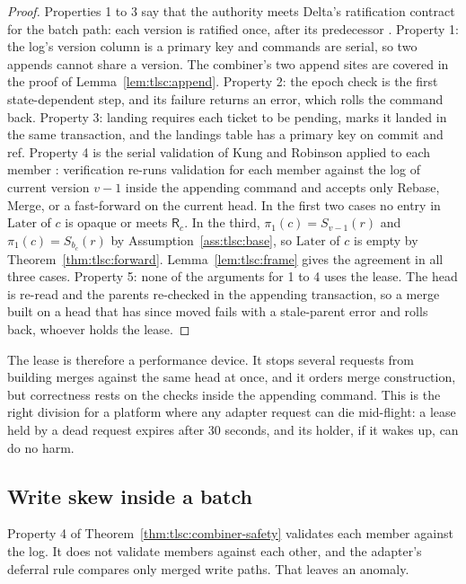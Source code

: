 \documentclass[11pt,letterpaper]{article}
\theoremstyle{definition}
\theoremstyle{remark}
\newcommand{\R}{\mathsf{R}}
\newcommand{\Snap}[1]{S_{#1}}
\newcommand{\Later}{\mathrm{Later}}
\newcommand{\fp}{\pi_1}
\begin{document}
\begin{proof}
Properties 1 to 3 say that the authority meets Delta's ratification contract for the batch path: each version is ratified once, after its predecessor \cite{deltaprotocol}. Property 1: the log's version column is a primary key and commands are serial, so two appends cannot share a version. The combiner's two append sites are covered in the proof of Lemma~\ref{lem:tlsc:append}. Property 2: the epoch check is the first state-dependent step, and its failure returns an error, which rolls the command back. Property 3: landing requires each ticket to be pending, marks it landed in the same transaction, and the landings table has a primary key on commit and ref. Property 4 is the serial validation of Kung and Robinson applied to each member \cite[Section 4]{kung1981occ}: verification re-runs validation for each member against the log of current version $v-1$ inside the appending command and accepts only Rebase, Merge, or a fast-forward on the current head. In the first two cases no entry in $\Later$ of $c$ is opaque or meets $\R_c$. In the third, $\fp(c)=\Snap{v-1}(r)$ and $\fp(c)=\Snap{b_c}(r)$ by Assumption~\ref{ass:tlsc:base}, so $\Later$ of $c$ is empty by Theorem~\ref{thm:tlsc:forward}. Lemma~\ref{lem:tlsc:frame} gives the agreement in all three cases. Property 5: none of the arguments for 1 to 4 uses the lease. The head is re-read and the parents re-checked in the appending transaction, so a merge built on a head that has since moved fails with a stale-parent error and rolls back, whoever holds the lease.
\end{proof}

The lease is therefore a performance device. It stops several requests from building merges against the same head at once, and it orders merge construction, but correctness rests on the checks inside the appending command. This is the right division for a platform where any adapter request can die mid-flight: a lease held by a dead request expires after 30 seconds, and its holder, if it wakes up, can do no harm. %

\subsection{Write skew inside a batch}

Property 4 of Theorem~\ref{thm:tlsc:combiner-safety} validates each member against the log. It does not validate members against each other, and the adapter's deferral rule compares only merged write paths. That leaves an anomaly.
\end{document}
